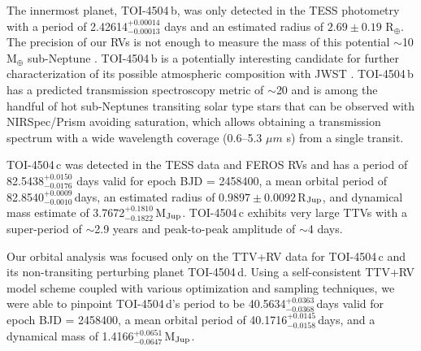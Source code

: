 \documentclass[twocolumn,twocolappendix]{aastex631}
\begin{document}
The innermost planet, TOI-4504\,b, was only detected in the TESS photometry with a period of 2.42614$^{+0.00014}_{-0.00013}$ days and an estimated radius of $2.69 \pm 0.19$ R$_{\oplus}$. The precision of our RVs is not enough to measure the mass of this potential $\sim$10 M$_{\oplus}$ sub-Neptune \citep{muller:2024}.
TOI-4504\,b is a potentially interesting candidate for further 
characterization of its possible atmospheric composition with JWST \citep[e.g.,][]{madhusudhan:2023,holmberg:2024}. TOI-4504\,b has a predicted transmission spectroscopy metric of $\sim$20 \citep{tsm} and is among the handful of hot sub-Neptunes transiting solar type stars that can be observed with NIRSpec/Prism avoiding saturation, which allows obtaining a transmission spectrum with a wide wavelength coverage (0.6--5.3 $\mu m$ s) from a single transit.



TOI-4504\,c was detected in the TESS data and FEROS RVs and has a period of 82.5438$_{-0.0176}^{+0.0150}$ days valid for epoch BJD = 2458400, a mean orbital period of  82.8540$_{-0.0010}^{+0.0009}$\,days, an estimated radius of $0.9897 \pm 0.0092$\,R$_{\rm Jup}$, and dynamical mass estimate of 3.7672$_{-0.1822}^{+0.1810}$\,M$_{\rm Jup}$. TOI-4504\,c exhibits very large TTVs with a super-period of $\sim$2.9 years and peak-to-peak amplitude of $\sim$4 days. 

Our orbital analysis was focused only on the TTV+RV data for TOI-4504\,c and its non-transiting perturbing planet TOI-4504\,d.
Using a self-consistent TTV+RV model scheme coupled with various optimization and sampling techniques, we were able to pinpoint TOI-4504\,d's period to be 40.5634$_{-0.0368}^{+0.0363}$\,days valid for epoch BJD = 2458400,  a mean orbital period of 40.1716$_{-0.0158}^{+0.0145}$\,days, and a dynamical mass of 1.4166$_{-0.0647}^{+0.0651}$\,M$_{\rm Jup}$.  
 

\end{document}
